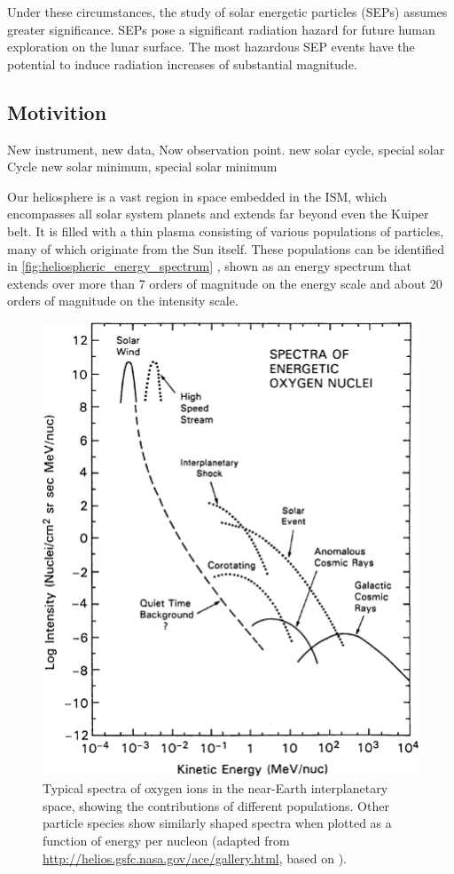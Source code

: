 Under these circumstances, the study of solar energetic particles (SEPs) assumes greater significance. SEPs pose a significant radiation hazard for future human exploration on the lunar surface. The most hazardous SEP events have the potential to induce radiation increases of substantial magnitude.

\subsection{Motivition}
New instrument, new data, 
Now observation point.
new solar cycle, special solar Cycle
new solar minimum, special solar minimum





Our heliosphere is a vast region in space embedded in the \ac{ISM}, which encompasses all solar system planets and extends far beyond even the Kuiper belt. 
It is filled with a thin plasma consisting of various populations of particles, many of which originate from the Sun itself. These populations can be identified in \autoref{fig:heliospheric_energy_spectrum} \citep[based on measurements by][]{Mewaldt-2001}, shown as an energy spectrum that extends over more than 7 orders of magnitude on the energy scale and about 20 orders of magnitude on the intensity scale.
\begin{figure}
    \centering
    \includegraphics[width=0.6\linewidth]{images/heliospheric_energy_spectrum}
    \caption[Spectra of oxygen ions in the near-Earth interplanetary space]{Typical spectra of oxygen ions in the near-Earth interplanetary space, showing the contributions of different populations. Other particle species show similarly shaped spectra when plotted as a function of energy per nucleon (adapted from \url{http://helios.gsfc.nasa.gov/ace/gallery.html}, based on \cite{Mewaldt-2001}).}
    \label{fig:heliospheric_energy_spectrum}
\end{figure}
